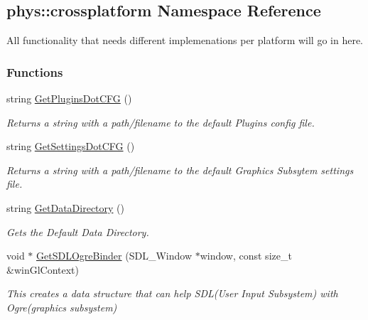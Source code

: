 \hypertarget{namespacephys_1_1crossplatform}{
\subsection{phys::crossplatform Namespace Reference}
\label{namespacephys_1_1crossplatform}
}


All functionality that needs different implemenations per platform will go in here.  


\subsubsection*{Functions}
\begin{DoxyCompactItemize}
\item 
string \hyperlink{namespacephys_1_1crossplatform_a8f7321f409f1f2a5fa07881ae22fcc2d}{GetPluginsDotCFG} ()
\begin{DoxyCompactList}\small\item\em Returns a string with a path/filename to the default Plugins config file. \item\end{DoxyCompactList}\item 
string \hyperlink{namespacephys_1_1crossplatform_a2d43f3aa5a485564c3f375b36a08152f}{GetSettingsDotCFG} ()
\begin{DoxyCompactList}\small\item\em Returns a string with a path/filename to the default Graphics Subsytem settings file. \item\end{DoxyCompactList}\item 
string \hyperlink{namespacephys_1_1crossplatform_ae7b1d4b6dac634392c6224f26ab85001}{GetDataDirectory} ()
\begin{DoxyCompactList}\small\item\em Gets the Default Data Directory. \item\end{DoxyCompactList}\item 
void $\ast$ \hyperlink{namespacephys_1_1crossplatform_a16d9a4174cbcac20670925e3d60465da}{GetSDLOgreBinder} (SDL\_\-Window $\ast$window, const size\_\-t \&winGlContext)
\begin{DoxyCompactList}\small\item\em This creates a data structure that can help SDL(User Input Subsystem) with Ogre(graphics subsystem) \item\end{DoxyCompactList}\item 

\end{DoxyCompactItemize}
